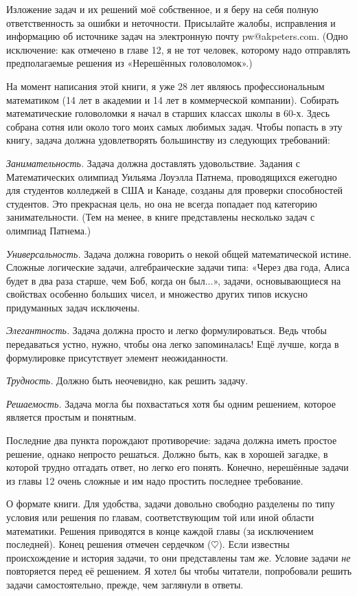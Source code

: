 Изложение задач и их решений моё собственное, и я беру на себя полную ответственность за ошибки и неточности.
Присылайте жалобы, исправления и информацию об источнике задач на электронную почту pw@akpeters.com.
(Одно исключение: как отмечено в главе 12, я не тот человек, которому надо отправлять предполагаемые решения из «Нерешённых головоломок».)

На момент написания этой книги, я уже 28 лет являюсь профессиональным математиком
(14 лет в академии и 14 лет в коммерческой компании).
Собирать математические головоломки я начал в старших классах школы в 60-х.
Здесь собрана сотня или около того моих самых любимых задач.
Чтобы попасть в эту книгу, задача должна удовлетворять большинству из следующих требований:

\textit{Занимательность.}
Задача должна доставлять удовольствие.
Задания с Математических олимпиад Уильяма Лоуэлла Патнема, проводящихся ежегодно для студентов колледжей в США и Канаде, созданы для проверки способностей студентов.
Это прекрасная цель, но она не всегда попадает под категорию занимательности.
(Тем на менее, в книге представлены несколько задач с олимпиад Патнема.)

\textit{Универсальность.}
Задача должна говорить о некой общей математической истине.
Сложные логические задачи, алгебраические задачи типа:
«Через два года, Алиса будет в два раза старше, чем Боб, когда он был...», задачи, основывающиеся на свойствах особенно больших  чисел, и множество других типов искусно придуманных задач исключены.

\textit{Элегантность.}
Задача должна  просто и легко формулироваться.
Ведь чтобы передаваться устно, нужно, чтобы она легко запоминалась! Ещё лучше, когда в формулировке присутствует элемент неожиданности.

\textit{Трудность.}
Должно быть неочевидно, как решить задачу.

\textit{Решаемость.}
Задача могла бы похвастаться хотя бы одним решением, которое является простым и понятным.

Последние два пункта порождают противоречие: задача должна иметь простое решение, однако непросто решаться.
Должно быть, как в хорошей загадке, в которой трудно отгадать ответ, но легко его понять.
Конечно, нерешённые задачи из главы 12 очень сложные и им  надо простить последнее требование.

О формате книги.
Для удобства, задачи довольно свободно разделены по типу условия или решения по главам, соответствующим той или иной области математики.
Решения приводятся в конце каждой главы (за исключением последней).
Конец решения отмечен сердечком ($\heartsuit$).
Если известны происхождение и история задачи, то они представлены там же.
Условие задачи \emph{не} повторяется перед её решением.
Я хотел бы чтобы читатели, попробовали решить задачи самостоятельно, прежде, чем заглянули в ответы.

